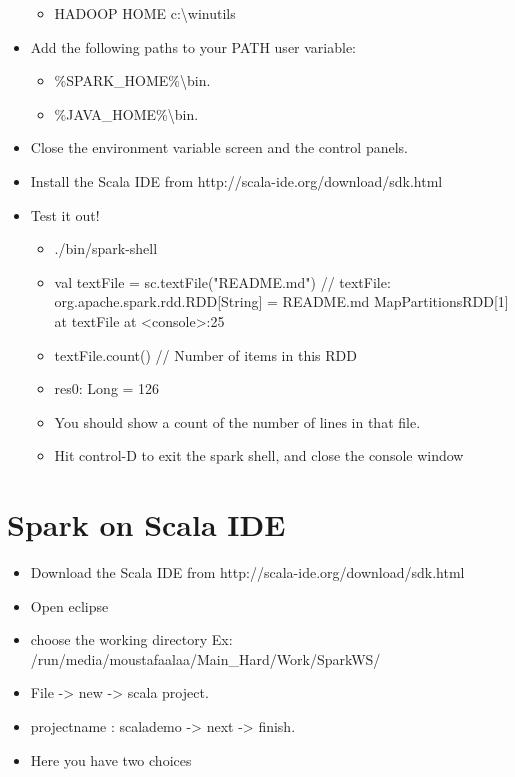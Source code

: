 \documentclass[]{article}
\begin{document}
\begin{itemize}
\begin{itemize}
				\item HADOOP HOME c:\textbackslash winutils
			\end{itemize}
	\item Add the following paths to your PATH user variable:
				\begin{itemize}
					\item  \%SPARK\_HOME\%\textbackslash bin.
					\item  \%JAVA\_HOME\%\textbackslash bin.
				\end{itemize}
		\item Close the environment variable screen and the control panels.
		\item Install the Scala IDE from http://scala-ide.org/download/sdk.html
		\item Test it out!
			\begin{itemize}
					\item ./bin/spark-shell

					\item val textFile = sc.textFile("README.md") // textFile: org.apache.spark.rdd.RDD[String] = README.md MapPartitionsRDD[1] at textFile at <console>:25
					\item textFile.count() // Number of items in this RDD
					\item res0: Long = 126

					\item You should show a count of the number of lines in that file.
					\item Hit control-D to exit the spark shell, and close the console window
			\end{itemize}
		
	
\end{itemize}

\section{Spark on Scala IDE}
\begin{itemize}

	\item Download the Scala IDE from http://scala-ide.org/download/sdk.html
	\item Open eclipse 
	\item choose the working directory Ex: /run/media/moustafaalaa/Main\_Hard/Work/SparkWS/
	\item File -> new -> scala project.
	\item projectname : scalademo -> next -> finish.
	\item Here you have two choices 	
\end{itemize}
\end{document}

